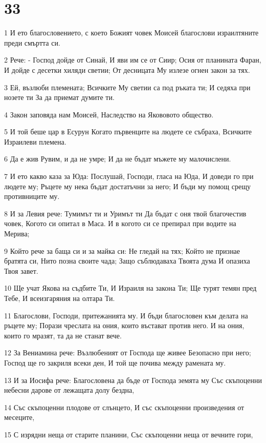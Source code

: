 \chapter{33}

\par 1 И ето благословението, с което Божият човек Моисей благослови израилтяните преди смъртта си.
\par 2 Рече: - Господ дойде от Синай, И яви им се от Сиир; Осия от планината Фаран, И дойде с десетки хиляди светии; От десницата Му излезе огнен закон за тях.
\par 3 Ей, възлюби племената; Всичките Му светии са под ръката ти; И седяха при нозете ти За да приемат думите ти.
\par 4 Закон заповяда нам Моисей, Наследство на Якововото общество.
\par 5 И той беше цар в Есурун Когато първенците на людете се събраха, Всичките Израилеви племена.
\par 6 Да е жив Рувим, и да не умре; И да не бъдат мъжете му малочислени.
\par 7 И ето какво каза за Юда: Послушай, Господи, гласа на Юда, И доведи го при людете му; Ръцете му нека бъдат достатъчни за него; И бъди му помощ срещу противниците му.
\par 8 И за Левия рече: Тумимът ти и Уримът ти Да бъдат с оня твой благочестив човек, Когото си опитал в Маса. И в когото си се препирал при водите на Мерива;
\par 9 Който рече за баща си и за майка си: Не гледай на тях; Който не признае братята си, Нито позна своите чада; Защо съблюдаваха Твоята дума И опазиха Твоя завет.
\par 10 Ще учат Якова на съдбите Ти, И Израиля на закона Ти; Ще турят темян пред Тебе, И всеизгаряния на олтара Ти.
\par 11 Благослови, Господи, притежанията му. И бъди благословен към делата на ръцете му; Порази чреслата на ония, които въстават против него. И на ония, които го мразят, та да не станат вече.
\par 12 За Вениамина рече: Възлюбеният от Господа ще живее Безопасно при него; Господ ще го закриля всеки ден, И той ще почива между рамената му.
\par 13 И за Иосифа рече: Благословена да бъде от Господа земята му Със скъпоценни небесни дарове от лежащата долу бездна,
\par 14 Със скъпоценни плодове от слънцето, И със скъпоценни произведения от месеците,
\par 15 С изрядни неща от старите планини, Със скъпоценни неща от вечните гори,
